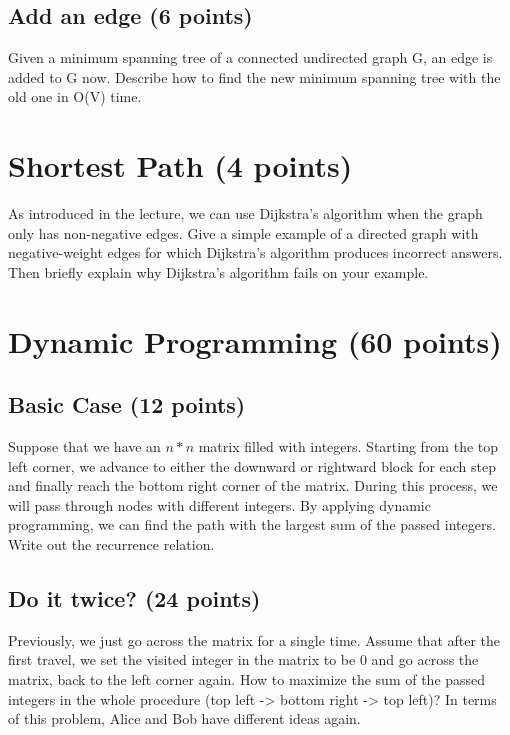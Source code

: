 \documentclass[11pt]{exam}
\begin{document}
\subsection{Add an edge (6 points)}
Given a minimum spanning tree of a connected undirected graph G, an edge is added to G now. Describe how to find the new minimum spanning tree with the old one in O(V) time.
\begin{solution}
\end{solution}

\section{Shortest Path (4 points)}
As introduced in the lecture, we can use Dijkstra's algorithm when the graph only has non-negative edges. Give a simple example of a directed graph with negative-weight edges for which Dijkstra's algorithm produces incorrect answers. Then briefly explain why Dijkstra's algorithm fails on your example.
\begin{solution}
\end{solution}

\section{Dynamic Programming (60 points)}
\subsection{Basic Case (12 points)}
\label{simple_repeat}
Suppose that we have an $n*n$ matrix filled with integers. Starting from the top left corner, we advance to either the downward or rightward block for each step and finally reach the bottom right corner of the matrix. During this process, we will pass through nodes with different integers. By applying dynamic programming, we can find the path with the largest sum of the passed integers. Write out the recurrence relation.
\begin{solution}
\end{solution}
\subsection{Do it twice? (24 points)}
Previously, we just go across the matrix for a single time. Assume that after the first travel, we set the visited integer in the matrix to be 0 and go across the matrix, back to the left corner again. How to maximize the sum of the passed integers in the whole procedure (top left -> bottom right -> top left)? In terms of this problem, Alice and Bob have different ideas again.
\end{document}
